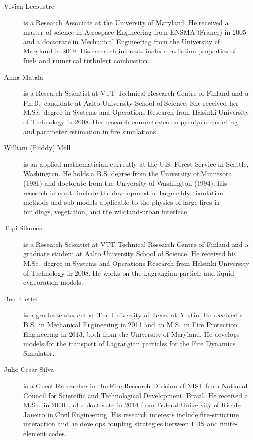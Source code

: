 \begin{description}
\item[Vivien Lecoustre] is a Research Associate at the University of Maryland. He received a master of science in Aerospace Engineering from ENSMA (France) in 2005 and a doctorate in Mechanical Engineering from the University of Maryland in 2009. His research interests include radiation properties of fuels and numerical turbulent combustion.

\item[Anna Matala] is a Research Scientist at VTT Technical Research Centre of Finland and a Ph.D.~candidate at Aalto University School of Science. She received her M.Sc.~degree in Systems and Operations Research from Helsinki University of Technology in 2008. Her research concentrates on pyrolysis modelling and parameter estimation in fire simulations

\item[William (Ruddy) Mell] is an applied mathematician currently at the U.S. Forest Service in Seattle, Washington. He holds a B.S. degree from the University of Minnesota (1981) and doctorate from the University of Washington (1994). His research interests include the development of large-eddy simulation methods and sub-models applicable to the physics of large fires in buildings, vegetation, and the wildland-urban interface.

\item[Topi Sikanen] is a Research Scientist at VTT Technical Research Centre of Finland and a graduate student at Aalto University School of Science. He received his M.Sc.~degree in Systems and Operations Research from Helsinki University of Technology in 2008. He works on the Lagrangian particle and liquid evaporation models.

\item[Ben Trettel] is a graduate student at The University of Texas at Austin. He received a B.S.~in Mechanical Engineering in 2011 and an M.S.~in Fire Protection Engineering in 2013, both from the University of Maryland. He develops models for the transport of Lagrangian particles for the Fire Dynamics Simulator.

\item[Julio Cesar Silva] is a Guest Researcher in the Fire Research Division of NIST from National Council for Scientific and Technological Development, Brazil. He received a M.Sc.~in 2010 and a doctorate in 2014 from Federal University of Rio de Janeiro in Civil Engineering. His research interests include fire-structure interaction and he develops coupling strategies between FDS and finite-element codes.


\end{description}
